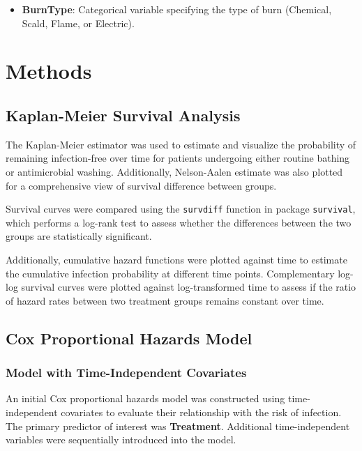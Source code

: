 \documentclass[12pt]{article}
\providecommand{\tightlist}{%
  \setlength{\itemsep}{0pt}\setlength{\parskip}{0pt}}
\begin{document}
\begin{itemize}
\tightlist
\item
  \textbf{BurnType}: Categorical variable specifying the type of burn
  (Chemical, Scald, Flame, or Electric).
\end{itemize}

\section{Methods}\label{methods}

\subsection{\texorpdfstring{\textbf{Kaplan-Meier Survival
Analysis}}{Kaplan-Meier Survival Analysis}}\label{kaplan-meier-survival-analysis}

The Kaplan-Meier estimator was used to estimate and visualize the
probability of remaining infection-free over time for patients
undergoing either routine bathing or antimicrobial washing.
Additionally, Nelson-Aalen estimate was also plotted for a comprehensive
view of survival difference between groups.

Survival curves were compared using the \texttt{survdiff} function in
package \texttt{survival}, which performs a log-rank test to assess
whether the differences between the two groups are statistically
significant.

Additionally, cumulative hazard functions were plotted against time to
estimate the cumulative infection probability at different time points.
Complementary log-log survival curves were plotted against
log-transformed time to assess if the ratio of hazard rates between two
treatment groups remains constant over time.

\subsection{\texorpdfstring{\textbf{Cox Proportional Hazards
Model}}{Cox Proportional Hazards Model}}\label{cox-proportional-hazards-model}

\subsubsection{\texorpdfstring{\textbf{Model with Time-Independent
Covariates}}{Model with Time-Independent Covariates}}\label{model-with-time-independent-covariates}

An initial Cox proportional hazards model was constructed using
time-independent covariates to evaluate their relationship with the risk
of infection. The primary predictor of interest was \textbf{Treatment}.
Additional time-independent variables were sequentially introduced into
the model.
\end{document}
